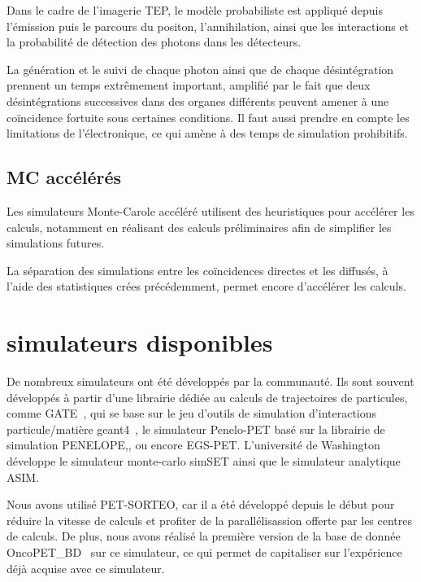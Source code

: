 Dans le cadre de l'imagerie TEP, le modèle probabiliste est appliqué depuis l'émission puis le parcours du positon, l'annihilation, ainsi que les interactions et la probabilité de détection des photons dans les détecteurs.

La génération et le suivi de chaque photon ainsi que de chaque désintégration prennent un temps extrêmement important, amplifié par le fait que deux désintégrations successives dans des organes différents peuvent amener à une coïncidence fortuite sous certaines conditions. Il faut aussi prendre en compte les limitations de l'électronique, ce qui amène à des temps de simulation prohibitifs.

		\subsection{MC accélérés}

Les simulateurs Monte-Carole accéléré utilisent des heuristiques pour accélérer les calculs, notamment en réalisant des calculs préliminaires afin de simplifier les simulations futures. 

La séparation des simulations entre les coïncidences directes et les diffusés, à l’aide des statistiques crées précédemment, permet encore d’accélérer les calculs.

	\section{simulateurs disponibles}

De nombreux simulateurs ont été développés par la communauté. Ils sont souvent développés à partir d'une librairie dédiée au calculs de trajectoires de particules, comme GATE~\cite{jan2004gate}, qui se base sur le jeu d'outils de simulation d'interactions particule/matière geant4~\cite{allison2006geant4}, le simulateur Penelo-PET\cite{espana2009penelopet} basé sur la librairie de simulation  PENELOPE,\cite{salvat2006penelope}, ou encore EGS-PET. L’université de Washington développe le simulateur monte-carlo simSET ainsi que le simulateur analytique ASIM. 

Nous avons utilisé PET-SORTEO, car il a été développé depuis le début pour réduire la vitesse de calculs et profiter de la parallélisassion offerte par les centres de calculs. De plus, nous avons réalisé la première version de la base de donnée OncoPET\_BD~\cite{tomei2010oncopet_db} sur ce simulateur, ce qui permet de capitaliser sur l’expérience déjà acquise avec ce simulateur. 

